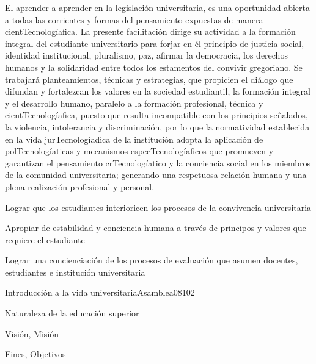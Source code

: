 \begin{syllabus}


\begin{justification}
El aprender a aprender en la legislación universitaria, es una oportunidad 
abierta a todas las corrientes y formas del pensamiento expuestas de manera 
cientTecnologíafica. La presente facilitación dirige su actividad a la formación integral 
del estudiante universitario para forjar en él principio de justicia social, 
identidad institucional, pluralismo, paz, afirmar la democracia, los 
derechos humanos y la solidaridad entre todos los estamentos del convivir 
gregoriano. Se trabajará planteamientos, técnicas y estrategias, que 
propicien el diálogo que difundan y fortalezcan los valores en la 
sociedad estudiantil, la formación integral y el desarrollo humano, 
paralelo a la formación profesional, técnica y cientTecnologíafica, puesto 
que resulta incompatible con los principios señalados, la violencia, 
intolerancia y discriminación, por lo que la normatividad establecida 
en la vida jurTecnologíadica de la institución adopta la aplicación de polTecnologíaticas 
y mecanismos especTecnologíaficos que promueven y garantizan el pensamiento crTecnologíatico 
y la conciencia social en los miembros de la comunidad universitaria; 
generando una respetuosa relación humana y una plena realización 
profesional y personal.
\end{justification}

\begin{goals}
\item Lograr que los estudiantes interioricen los procesos de la convivencia universitaria
\item Apropiar de estabilidad y conciencia humana a través de principos y valores que requiere el estudiante
\item Lograr una concienciación de los procesos de evaluación que asumen docentes, estudiantes e institución universitaria
\end{goals}

\begin{outcomes}
\end{outcomes}

\begin{unit}{Introducción a la vida universitaria}{Asamblea08}{10}{2}
   \begin{topics}
	\item Naturaleza de la educación superior
	\item Visión, Misión
	\item Fines, Objetivos
   \end{topics}


\end{unit}
\end{syllabus}
